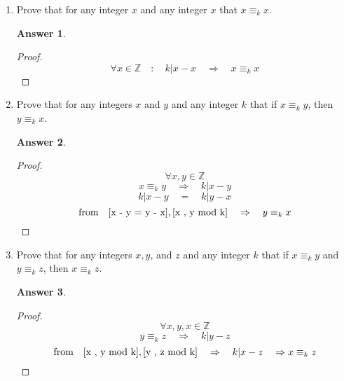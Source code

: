 \documentclass{article}
\renewcommand{\(}{\left(}
\renewcommand{\)}{\right)}
\theoremstyle{plain}
\theoremstyle{plain}
\theoremstyle{definition}
\newtheorem*{answer}{Answer}
\begin{document}
\begin{enumerate}[label*=\roman*.,ref=\roman*]
\item Prove that for any integer $x$ and any integer $x$ that $ x \equiv_k x $.
\begin{shaded}
\begin{answer}
\begin{proof}
 $$ \forall x \in \mathds{Z} \quad : \quad k | x - x \quad \Rightarrow \quad x \equiv_k x $$
\end{proof}
\end{answer}
\end{shaded}

\item Prove that for any integers $x$ and $y$ and any integer $k$ that if $x \equiv_k y$, then $y \equiv_k x$.
\begin{shaded}
\begin{answer}
\begin{proof}
$$ \forall x , y \in \mathds{Z} $$
\begin{equation}\label{x , y mod k}
x \equiv_k y \quad \Rightarrow \quad k | x - y
\end{equation}
\begin{equation}\label{x - y = y - x}
  k | x - y \quad = \quad k | y - x
\end{equation}
$$ \text{from} \quad \ref{x - y = y - x}, \ref{x , y mod k} \quad \Rightarrow \quad y \equiv_k x $$
\end{proof}
\end{answer}
\end{shaded}

\item Prove that for any integers $x, y$, and $z$ and any integer $k$ that if $x \equiv_k y$ and $y \equiv_k z$, then $x \equiv_k z$.
\begin{shaded}
\begin{answer}
\begin{proof}
$$ \forall x , y , x \in \mathds{Z} $$
\begin{equation}\label{y , z mod k}
  y \equiv_k z \quad \Rightarrow \quad k | y - z
\end{equation}
$$ \text{from} \quad \ref{x , y mod k} , \ref{y , z mod k} \quad \Rightarrow \quad k | x - z \quad \Rightarrow x \equiv_k z  $$
\end{proof}
\end{answer}
\end{shaded}


\end{enumerate}
\end{document}
